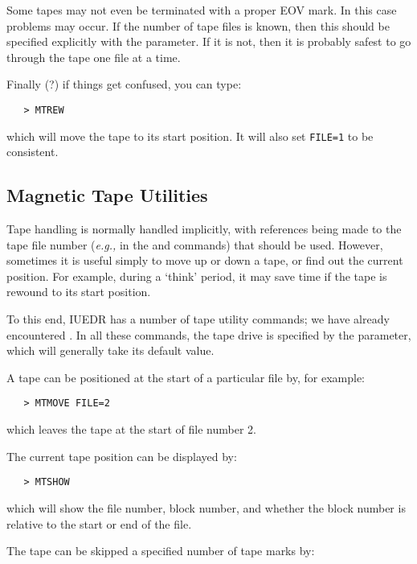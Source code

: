 Some tapes may not even be terminated with a proper EOV mark.  In this case
problems may occur.  If the number of tape files is known, then this should be
specified explicitly with the 
 parameter.  If it is not, then it is
probably safest to go through the tape one file at a time.

Finally (?) if things get confused, you can type:

\begin{verbatim}
   > MTREW
\end{verbatim}

which will move the tape to its start position.  It will also set
\verb+FILE=1+ to be consistent.


\subsection{Magnetic Tape Utilities}

Tape handling is normally handled implicitly, with references being made to
the tape file number ({\it{e.g.,}} in the
 and
 commands) that
should be used.  However, sometimes it is useful simply to move up or down
a tape, or find out the current position.  For example, during a `think'
period, it may save time if the tape is rewound to its start position.

To this end, IUEDR has a number of tape utility commands; we have already
encountered \@.  In all these commands, the
tape drive is specified by the  parameter,
which will generally take its default value.

A tape can be positioned at the start of a particular file by, for example:

\begin{verbatim}
   > MTMOVE FILE=2
\end{verbatim}

which leaves the tape at the start of file number 2.

The current tape position can be displayed by:

\begin{verbatim}
   > MTSHOW
\end{verbatim}

which will show the file number, block number, and whether the block number
is relative to the start or end of the file.

The tape can be skipped a specified number of tape marks by:

